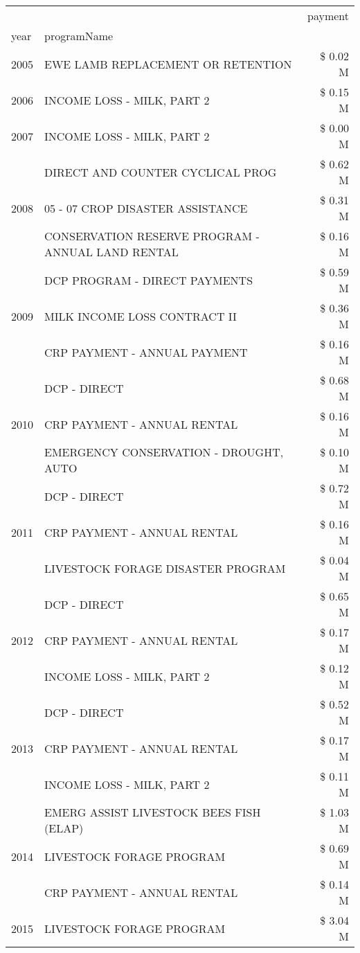 \begin{tabular}{llr}
\toprule
 &  & payment \\
year & programName &  \\
\midrule
2005 & EWE LAMB REPLACEMENT OR RETENTION & \$ 0.02 M \\
\cline{1-3}
2006 & INCOME LOSS - MILK, PART 2 & \$ 0.15 M \\
\cline{1-3}
2007 & INCOME LOSS - MILK, PART 2 & \$ 0.00 M \\
\cline{1-3}
\multirow[t]{3}{*}{2008} & DIRECT AND COUNTER CYCLICAL PROG & \$ 0.62 M \\
 & 05 - 07 CROP DISASTER ASSISTANCE & \$ 0.31 M \\
 & CONSERVATION RESERVE PROGRAM - ANNUAL LAND RENTAL & \$ 0.16 M \\
\cline{1-3}
\multirow[t]{3}{*}{2009} & DCP PROGRAM - DIRECT PAYMENTS & \$ 0.59 M \\
 & MILK INCOME LOSS CONTRACT II & \$ 0.36 M \\
 & CRP PAYMENT - ANNUAL PAYMENT & \$ 0.16 M \\
\cline{1-3}
\multirow[t]{3}{*}{2010} & DCP - DIRECT & \$ 0.68 M \\
 & CRP PAYMENT - ANNUAL RENTAL & \$ 0.16 M \\
 & EMERGENCY CONSERVATION - DROUGHT, AUTO & \$ 0.10 M \\
\cline{1-3}
\multirow[t]{3}{*}{2011} & DCP - DIRECT & \$ 0.72 M \\
 & CRP PAYMENT - ANNUAL RENTAL & \$ 0.16 M \\
 & LIVESTOCK FORAGE DISASTER PROGRAM & \$ 0.04 M \\
\cline{1-3}
\multirow[t]{3}{*}{2012} & DCP - DIRECT & \$ 0.65 M \\
 & CRP PAYMENT - ANNUAL RENTAL & \$ 0.17 M \\
 & INCOME LOSS - MILK, PART 2 & \$ 0.12 M \\
\cline{1-3}
\multirow[t]{3}{*}{2013} & DCP - DIRECT & \$ 0.52 M \\
 & CRP PAYMENT - ANNUAL RENTAL & \$ 0.17 M \\
 & INCOME LOSS - MILK, PART 2 & \$ 0.11 M \\
\cline{1-3}
\multirow[t]{3}{*}{2014} & EMERG ASSIST LIVESTOCK BEES FISH (ELAP) & \$ 1.03 M \\
 & LIVESTOCK FORAGE PROGRAM & \$ 0.69 M \\
 & CRP PAYMENT - ANNUAL RENTAL & \$ 0.14 M \\
\cline{1-3}
\multirow[t]{3}{*}{2015} & LIVESTOCK FORAGE PROGRAM & \$ 3.04 M \\

\end{tabular}
